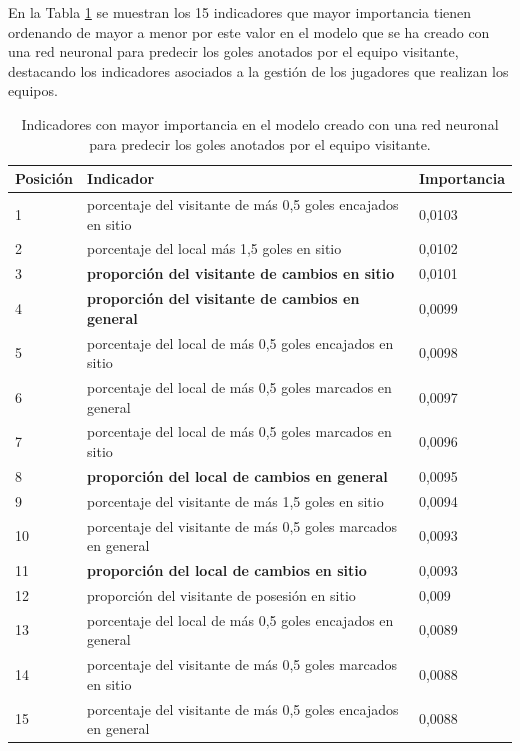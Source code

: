     
   
En la Tabla \ref{table:importancia-indicadores-visitante} se muestran los 15 indicadores que mayor importancia tienen ordenando de mayor a menor por este valor en el modelo que se ha creado con una red neuronal para predecir los goles anotados por el equipo visitante, destacando los indicadores asociados a la gestión de los jugadores que realizan los equipos.


    \begin{table}[]
        \begin{tabular}{|l|l|l|}
        \hline
        \rowcolor[HTML]{C0C0C0} 
        Posición & Indicador & Importancia \\ \hline
        1        &   porcentaje del visitante de más 0,5 goles encajados en sitio&	0,0103       \\ \hline
        2        &     porcentaje del local más 1,5 goles en sitio&	0,0102     \\ \hline
        3        &     \textbf{proporción del visitante de cambios en sitio}&	0,0101        \\ \hline
        4        &    \textbf{proporción del visitante de cambios en general}&	0,0099      \\ \hline
        5        &     porcentaje del local de más 0,5 goles encajados en sitio&	0,0098       \\ \hline
        6        &    porcentaje del local de más 0,5 goles marcados en general&	0,0097        \\ \hline
        7        &    porcentaje del local de más 0,5 goles marcados en sitio&	0,0096       \\ \hline
        8        &    \textbf{proporción del local de cambios en general}&	0,0095     \\ \hline
        9        &   porcentaje del visitante de más 1,5 goles en sitio&	0,0094       \\ \hline
        10        &   porcentaje del visitante de más 0,5 goles marcados en general&	0,0093      \\ \hline
        11       &     \textbf{proporción del local de cambios en sitio}&	0,0093      \\ \hline
        12       &    proporción del visitante de posesión en sitio&	0,009        \\ \hline
        13       &     porcentaje del local de más 0,5 goles encajados en general&	0,0089        \\ \hline
        14       &   porcentaje del visitante de más 0,5 goles marcados en sitio&	0,0088     \\ \hline
        15       &     porcentaje del visitante de más 0,5 goles encajados en general&	0,0088      \\ \hline
    
        \end{tabular}
        \caption{Indicadores con mayor importancia en el modelo creado con una red neuronal para predecir los goles anotados por el equipo visitante.}
        \label{table:importancia-indicadores-visitante}
        \end{table}
        
